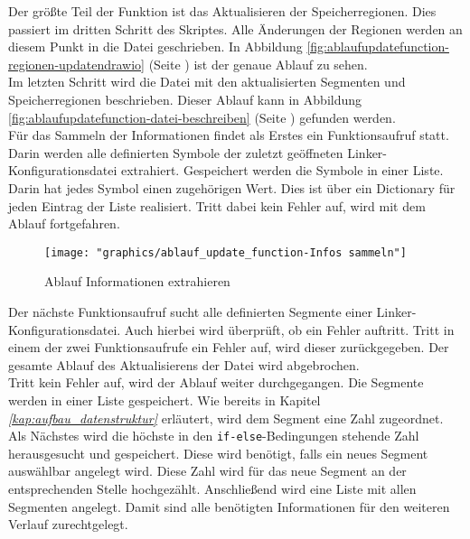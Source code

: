 Der größte Teil der Funktion ist das Aktualisieren der Speicherregionen.
Dies passiert im dritten Schritt des Skriptes.
Alle Änderungen der Regionen werden an diesem Punkt in die Datei geschrieben.
In Abbildung \ref{fig:ablaufupdatefunction-regionen-updatendrawio} (Seite \pageref{fig:ablaufupdatefunction-regionen-updatendrawio}) ist der genaue Ablauf zu sehen.\\

Im letzten Schritt wird die Datei mit den aktualisierten Segmenten und Speicherregionen beschrieben.
Dieser Ablauf kann in Abbildung \ref{fig:ablaufupdatefunction-datei-beschreiben} (Seite \pageref{fig:ablaufupdatefunction-datei-beschreiben}) gefunden werden. \\

Für das Sammeln der Informationen findet als Erstes ein Funktionsaufruf statt.
Darin werden alle definierten Symbole der zuletzt geöffneten Linker-Konfigurationsdatei extrahiert.
Gespeichert werden die Symbole in einer Liste.
Darin hat jedes Symbol einen zugehörigen Wert.
Dies ist über ein Dictionary für jeden Eintrag der Liste realisiert.
Tritt dabei kein Fehler auf, wird mit dem Ablauf fortgefahren. \\

\begin{figure}[H]
	\centering
	\texttt{[image: "graphics/ablauf\_update\_function-Infos sammeln"]}
	\caption{Ablauf Informationen extrahieren}
	\label{fig:ablaufupdatefunction-infos-sammeln}
\end{figure}

Der nächste Funktionsaufruf sucht alle definierten Segmente einer Linker-Konfigurationsdatei.
Auch hierbei wird überprüft, ob ein Fehler auftritt.
Tritt in einem der zwei Funktionsaufrufe ein Fehler auf, wird dieser zurückgegeben.
Der gesamte Ablauf des Aktualisierens der Datei wird abgebrochen. \\

Tritt kein Fehler auf, wird der Ablauf weiter durchgegangen.
Die Segmente werden in einer Liste gespeichert.
Wie bereits in Kapitel \textit{\ref{kap:aufbau_datenstruktur} } erläutert, wird dem Segment eine Zahl zugeordnet.
Als Nächstes wird die höchste in den \verb*|if-else|-Bedingungen stehende Zahl herausgesucht und gespeichert.
Diese wird benötigt, falls ein neues Segment auswählbar angelegt wird.
Diese Zahl wird für das neue Segment an der entsprechenden Stelle hochgezählt.
Anschließend wird eine Liste mit allen Segmenten angelegt.
Damit sind alle benötigten Informationen für den weiteren Verlauf zurechtgelegt. \\

